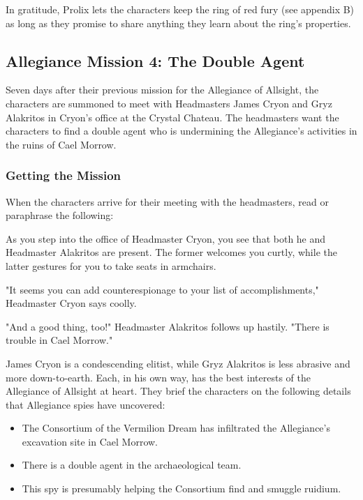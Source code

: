 \documentclass[10pt,a4paper,twoside,twocolumn,openany,nodeprecatedcode]{dndbook}
\begin{document}
In gratitude, Prolix lets the characters keep the ring of red fury (see appendix B) as long as they promise to share anything they learn about the ring's properties.

\subsection{Allegiance Mission 4: The Double Agent}
Seven days after their previous mission for the Allegiance of Allsight, the characters are summoned to meet with Headmasters James Cryon and Gryz Alakritos in Cryon's office at the Crystal Chateau. The headmasters want the characters to find a double agent who is undermining the Allegiance's activities in the ruins of Cael Morrow.

\subsubsection{Getting the Mission}
When the characters arrive for their meeting with the headmasters, read or paraphrase the following:

\begin{DndReadAloud}{}
As you step into the office of Headmaster Cryon, you see that both he and Headmaster Alakritos are present. The former welcomes you curtly, while the latter gestures for you to take seats in armchairs.

"It seems you can add counterespionage to your list of accomplishments," Headmaster Cryon says coolly.

"And a good thing, too!" Headmaster Alakritos follows up hastily. "There is trouble in Cael Morrow."

\end{DndReadAloud}

James Cryon is a condescending elitist, while Gryz Alakritos is less abrasive and more down-to-earth. Each, in his own way, has the best interests of the Allegiance of Allsight at heart. They brief the characters on the following details that Allegiance spies have uncovered:


\begin{itemize}
\item The Consortium of the Vermilion Dream has infiltrated the Allegiance's excavation site in Cael Morrow.
\item There is a double agent in the archaeological team.
\item This spy is presumably helping the Consortium find and smuggle ruidium.
\end{itemize}
\end{document}
